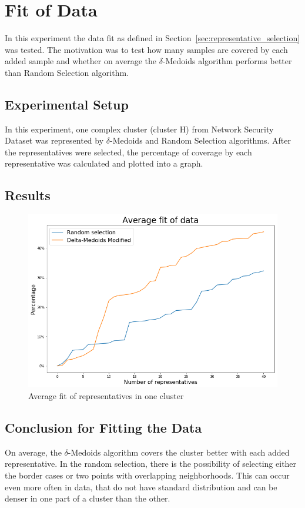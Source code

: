 \documentclass[thesis=B,english]{FITthesis}[2012/10/20]
\begin{document}
\section{Fit of Data}\label{sec:exp5}

In this experiment the data fit as defined in Section~\ref{sec:representative_selection} was tested.
The motivation was to test how many samples are covered by each added sample and whether on average the $\delta$-Medoids algorithm performs better than Random Selection algorithm.

\subsection{Experimental Setup}
In this experiment, one complex cluster (cluster H) from Network Security Dataset was represented by $\delta$-Medoids and Random Selection algorithms.
After the representatives were selected, the percentage of coverage by each representative was calculated and plotted into a graph.

\subsection{Results}

\begin{figure}[H]
  \includegraphics[width=\linewidth]{img/exp5.png}
  \caption{Average fit of representatives in one cluster}
  \label{img:exp5}
\end{figure}

\subsection{Conclusion for Fitting the Data}
On average, the $\delta$-Medoids algorithm covers the cluster better with each added representative.
In the random selection, there is the possibility of selecting either the border cases or two points with overlapping neighborhoods.
This can occur even more often in data, that do not have standard distribution and can be denser in one part of a cluster than the other.
\end{document}
